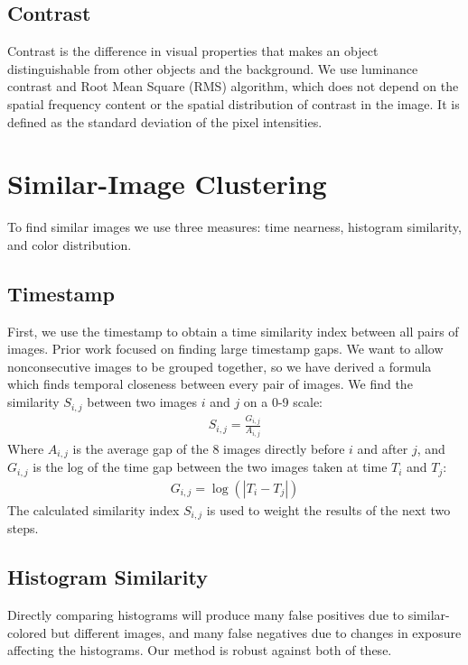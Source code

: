 \documentclass{sig-alternate}
\begin{document}
\subsection{Contrast}

Contrast is the difference in visual properties that makes an object distinguishable from other objects and the background.
We use luminance contrast and
Root Mean Square (RMS) algorithm, which does not depend on the spatial frequency content or the spatial distribution of contrast in the image. It is defined as the standard deviation of the pixel intensities\cite{ppr:1982}.

\section{Similar-Image Clustering}
To find similar images we use three measures: time nearness, histogram similarity, and color distribution.

\subsection{Timestamp}
First, we use the timestamp to obtain a time similarity index between all pairs of images. Prior work focused on finding large timestamp gaps\cite{1292402}. We want to allow nonconsecutive images to be grouped together, so we have derived a formula which finds temporal closeness between every pair of images. We find the similarity \(S_{i,j}\) between two images \(i\) and \(j\) on a 0-9 scale:
\begin{eqnarray}
S_{i,j}=\frac{G_{i,j}}{A_{i,j}}
\end{eqnarray}
Where \(A_{i,j}\) is the average gap of the 8 images directly before \(i\) and after \(j\), and  \(G_{i,j}\) is the log of the time gap between the two images taken at time \(T_i\) and \(T_j\):
\begin{eqnarray}
G_{i,j}=\log(|T_i-T_j|)
\end{eqnarray}
The calculated similarity index \(S_{i,j}\) is used to weight the results of the next two steps.


\subsection{Histogram Similarity}
Directly comparing histograms will produce many false positives due to similar-colored but different images, and many false negatives due to changes in exposure affecting the histograms. Our method is robust against both of these.
\end{document}
